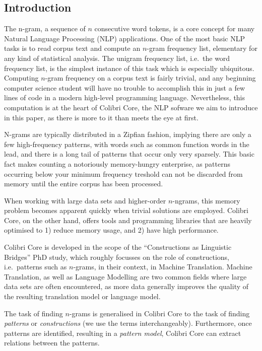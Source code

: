 \documentclass[a4paper,12pt]{article}
\begin{document}
\subsection{Introduction}

The n-gram, a sequence of $n$ consecutive word tokens, is a core concept for
many Natural Language Processing (NLP) applications. One of the most basic NLP
tasks is to read corpus text and compute an $n$-gram frequency list, elementary
for any kind of statistical analysis. The unigram frequency list, i.e.\ the word
frequency list, is the simplest instance of this task which is especially
ubiquitous. Computing $n$-gram frequency on a corpus text is fairly trivial,
and any beginning computer science student will have no trouble to accomplish
this in just a few lines of code in a modern high-level programming language.
Nevertheless, this computation is at the heart of Colibri Core, the NLP sofware
we aim to introduce in this paper, as there is more to it than meets the eye at
first.

N-grams are typically distributed in a Zipfian fashion, implying there are only
a few high-frequency patterns, with words such as common function words in the
lead, and there is a long tail of patterns that occur only very sparsely. This
basic fact makes counting a notoriously memory-hungry enterprise, as patterns
occurring below your minimum frequency treshold can not be discarded from
memory until the entire corpus has been processed. 

When working with large data sets and higher-order $n$-ngrams, this memory
problem becomes apparent quickly when trivial solutions are employed. Colibri
Core, on the other hand, offers tools and programming libraries that are
heavily optimised to 1) reduce memory usage, and 2) have high performance.

Colibri Core is developed in the scope of the ``Constructions as Linguistic
Bridges'' PhD study, which roughly focusses on the role of constructions, i.e.\ 
patterns such as $n$-grams, in their context, in Machine Translation. Machine
Translation, as well as Language Modelling are two common fields where large
data sets are often encountered, as more data generally improves the quality of
the resulting translation model or language model. 

The task of finding $n$-grams is generalised in Colibri Core to the task of
finding \emph{patterns} or \emph{constructions} (we use the terms
interchangeably). Furthermore, once patterns are identified, resulting in a
\emph{pattern model}, Colibri Core can extract relations between the patterns.
\end{document}
